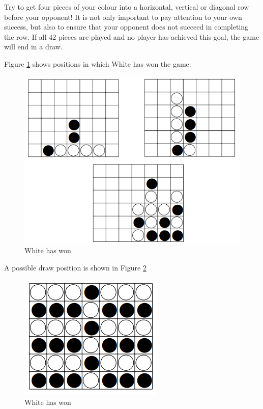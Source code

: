 \documentclass[conference,pdf,table,xcdraw, utf8]{IEEEtran}
\begin{document}
Try to get four pieces of your colour into a horizontal, vertical or diagonal row before your opponent! It is not only important to pay attention to your own success, but also to ensure that your opponent does not succeed in completing the row. If all 42 pieces are played and no player has achieved this goal, the game will end in a draw.~\cite{4connect_rules}

Figure \ref{figure:4gewinnt_white_wins.PNG} shows positions in which White has won the game:

\begin{figure}[H]
    \centering
    \includegraphics[scale=0.85]{images/4gewinnt_white_wins.PNG}
    \caption{White has won}
    \label{figure:4gewinnt_white_wins.PNG}
\end{figure}

A possible draw position is shown in Figure \ref{figure:4gewinnt_draw.PNG}

\begin{figure}[H]
    \centering
    \includegraphics[scale=0.95]{images/4gewinnt_draw.PNG}
    \caption{White has won}
    \label{figure:4gewinnt_draw.PNG}
\end{figure}
\end{document}
